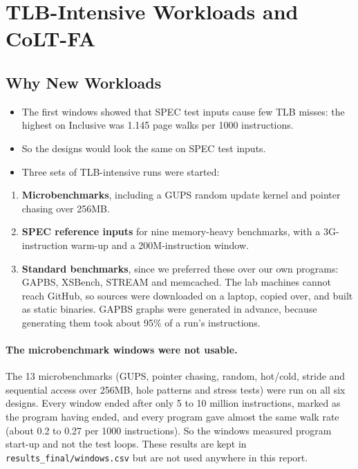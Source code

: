 \section{TLB-Intensive Workloads and CoLT-FA}
\label{sec:chr_workloads}

\subsection{Why New Workloads}
\begin{itemize}
    \item The first windows showed that SPEC test inputs cause few TLB misses: the highest on Inclusive was 1.145 page walks per 1000 instructions.
    \item So the designs would look the same on SPEC test inputs.
    \item Three sets of TLB-intensive runs were started:
\end{itemize}
\begin{enumerate}
    \item \textbf{Microbenchmarks}, including a GUPS random update kernel and pointer chasing over 256MB.
    \item \textbf{SPEC reference inputs} for nine memory-heavy benchmarks, with a 3G-instruction warm-up and a 200M-instruction window.
    \item \textbf{Standard benchmarks}, since we preferred these over our own programs: GAPBS, XSBench, STREAM and memcached. The lab machines cannot reach GitHub, so sources were downloaded on a laptop, copied over, and built as static binaries. GAPBS graphs were generated in advance, because generating them took about 95\% of a run's instructions.
\end{enumerate}

\paragraph{The microbenchmark windows were not usable.} The 13 microbenchmarks (GUPS, pointer chasing, random, hot/cold, stride and sequential access over 256MB, hole patterns and stress tests) were run on all six designs. Every window ended after only 5 to 10 million instructions, marked as the program having ended, and every program gave almost the same walk rate (about 0.2 to 0.27 per 1000 instructions). So the windows measured program start-up and not the test loops. These results are kept in \texttt{results\_final/windows.csv} but are not used anywhere in this report.

